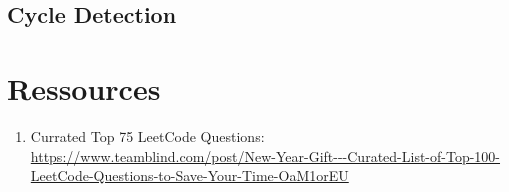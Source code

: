 \documentclass{article}
\begin{document}
\subsection{Cycle Detection}%
\label{sub:Cycle Detection}

\section*{Ressources}%
\label{sec:Ressources}

\begin{enumerate}
    \item Currated Top 75 LeetCode Questions: \url{https://www.teamblind.com/post/New-Year-Gift---Curated-List-of-Top-100-LeetCode-Questions-to-Save-Your-Time-OaM1orEU}
\end{enumerate}
\end{document}
